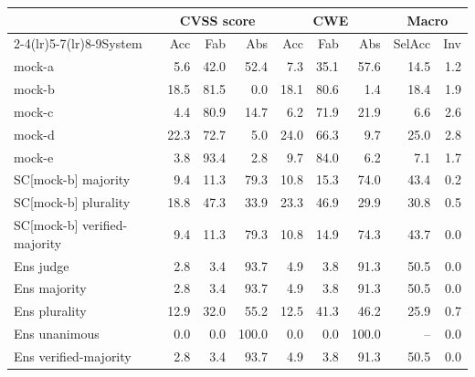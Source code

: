 \begin{tabular}{lrrrrrrrr}
\toprule
 & \multicolumn{3}{c}{CVSS score} & \multicolumn{3}{c}{CWE} & \multicolumn{2}{c}{Macro} \\\cmidrule(lr){2-4}\cmidrule(lr){5-7}\cmidrule(lr){8-9}System & Acc & Fab & Abs & Acc & Fab & Abs & SelAcc & Inv \\
\midrule
mock-a & 5.6 & 42.0 & 52.4 & 7.3 & 35.1 & 57.6 & 14.5 & 1.2 \\
mock-b & 18.5 & 81.5 & 0.0 & 18.1 & 80.6 & 1.4 & 18.4 & 1.9 \\
mock-c & 4.4 & 80.9 & 14.7 & 6.2 & 71.9 & 21.9 & 6.6 & 2.6 \\
mock-d & 22.3 & 72.7 & 5.0 & 24.0 & 66.3 & 9.7 & 25.0 & 2.8 \\
mock-e & 3.8 & 93.4 & 2.8 & 9.7 & 84.0 & 6.2 & 7.1 & 1.7 \\
\midrule
SC[mock-b] majority & 9.4 & 11.3 & 79.3 & 10.8 & 15.3 & 74.0 & 43.4 & 0.2 \\
SC[mock-b] plurality & 18.8 & 47.3 & 33.9 & 23.3 & 46.9 & 29.9 & 30.8 & 0.5 \\
SC[mock-b] verified-majority & 9.4 & 11.3 & 79.3 & 10.8 & 14.9 & 74.3 & 43.7 & 0.0 \\
\midrule
Ens judge & 2.8 & 3.4 & 93.7 & 4.9 & 3.8 & 91.3 & 50.5 & 0.0 \\
Ens majority & 2.8 & 3.4 & 93.7 & 4.9 & 3.8 & 91.3 & 50.5 & 0.0 \\
Ens plurality & 12.9 & 32.0 & 55.2 & 12.5 & 41.3 & 46.2 & 25.9 & 0.7 \\
Ens unanimous & 0.0 & 0.0 & 100.0 & 0.0 & 0.0 & 100.0 & -- & 0.0 \\
Ens verified-majority & 2.8 & 3.4 & 93.7 & 4.9 & 3.8 & 91.3 & 50.5 & 0.0 \\
\bottomrule
\end{tabular}
